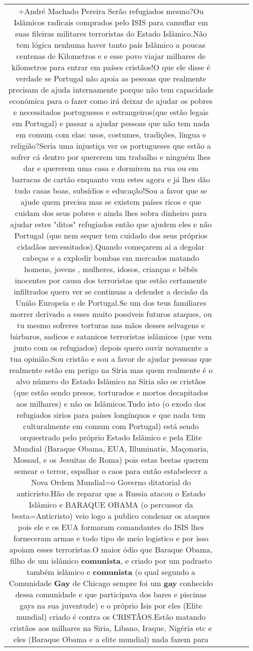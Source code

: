 \documentclass[11pt]{article}
\newlength\mylength
\begin{document}
\begin{center}
\begin{longtable}{|C{.65\mylength}|C{.30\mylength}|C{.12\mylength}|C{.12\mylength}|C{.12\mylength}|}
  \small +André Machado Pereira Serão refugiados mesmo?Ou Islâmicos radicais comprados pelo ISIS para camuflar em suas fileiras militares terroristas do Estado Islâmico.Não tem lógica nenhuma haver tanto país Islâmico a poucas centenas de Kilometros e e esse povo viajar milhares de kilometros para entrar em países cristãos!O que ele disse é verdade se Portugal não apoia as pessoas que realmente precisam de ajuda internamente porque não tem capacidade económica para o fazer como irá deixar de ajudar os pobres e necessitados portugueses e estrangeiros(que estão legais em Portugal) e passar a ajudar pessoas que não tem nada em comum com elas: usos, costumes, tradições, língua e religião?Seria uma injustiça ver os portugueses que estão a sofrer cá dentro por quererem um trabalho e ninguém lhes dar e quererem uma casa e dormirem na rua ou em barracas de cartão enquanto vem estes agora e já lhes dão tudo casas boas, subsídios e educação!Sou a favor que se ajude quem precisa mas se existem países ricos e que cuidam dos seus pobres e ainda lhes sobra dinheiro para ajudar estes "ditos" refugiados então que ajudem eles e não Portugal (que nem sequer tem cuidado dos seus próprios cidadãos necessitados).Quando começarem aí a degolar cabeças e a explodir bombas em mercados matando homens, jovens , mulheres, idosos, crianças e bêbês inocentes por causa dos terroristas que estão certamente infiltrados quero ver se continuas a defender a decisão da União Europeia e de Portugal.Se um dos teus familiares morrer derivado a esses muito possíveis futuros ataques, ou tu mesmo sofreres torturas nas mãos desses selvagens e bárbaros, sadicos e satanicos terroristas islâmicos (que vem junto com os refugiados) depois quero ouvir novamente a tua opinião.Sou cristão e sou a favor de ajudar pessoas que realmente estão em perigo na Síria mas quem realmente é o alvo número do Estado Islâmico na Síria são os cristãos (que estão sendo presos, torturados e mortos decapitados aos milhares) e não os Islâmicos.Tudo isto (o exodo dos refugiados sirios para países longínquos e que nada tem culturalmente em comum com Portugal) está sendo orquestrado pelo próprio Estado Islâmico e pela Elite Mundial (Baraque Obama, EUA, Illuminatis, Maçonaria, Mossad, e os Jesuitas de Roma) pois estas bestas querem semear o terror, espalhar o caos para então estabelecer a Nova Ordem Mundial=o Governo ditatorial do anticristo.Hão de reparar que a Russia atacou o Estado Islâmico e BARAQUE OBAMA (o percussor da besta=Anticristo) veio logo a publico condenar os ataques pois ele e os EUA formaram comandantes do ISIS lhes forneceram armas e todo tipo de meio logistico e por isso apoiam esses terroristas.O maior ódio que Baraque Obama, filho de um islâmico \textbf{comunista}, e criado por um padrasto também islâmico e \textbf{comunista} (o qual segundo a Comunidade \textbf{Gay} de Chicago sempre foi um \textbf{gay} conhecido dessa comunidade e que participava dos bares e piscinas gays na sua juventude) e o próprio Isis por eles (Elite mundial) criado é contra os CRISTÃOS.Estão matando cristãos aos milhares na Siria, Libano, Iraque, Nigéria etc e eles (Baraque Obama e a elite mundial) nada fazem para 
\end{longtable}
\end{center}
\end{document}
